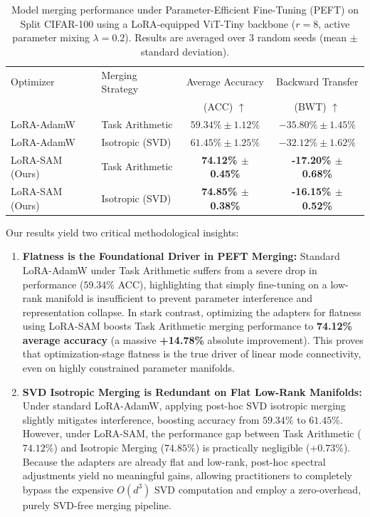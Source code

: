 \begin{table}[t]
  \caption{Model merging performance under Parameter-Efficient Fine-Tuning (PEFT) on Split CIFAR-100 using a LoRA-equipped ViT-Tiny backbone ($r=8$, active parameter mixing $\lambda=0.2$). Results are averaged over 3 random seeds (mean $\pm$ standard deviation).}
  \label{tab:peft_results}
  \vskip 0.1in
  \begin{center}
  \begin{small}
  \begin{sc}
  \setlength{\tabcolsep}{12pt}
  \begin{tabular}{llcc}
    \toprule
    Optimizer & Merging Strategy & Average Accuracy & Backward Transfer \\
    & & (ACC) $\uparrow$ & (BWT) $\uparrow$ \\
    \midrule
    LoRA-AdamW & Task Arithmetic & $59.34\% \pm 1.12\%$ & $-35.80\% \pm 1.45\%$ \\
    LoRA-AdamW & Isotropic (SVD) & $61.45\% \pm 1.25\%$ & $-32.12\% \pm 1.62\%$ \\
    \midrule
    LoRA-SAM (Ours) & Task Arithmetic & \textbf{74.12\% $\pm$ 0.45\%} & \textbf{-17.20\% $\pm$ 0.68\%} \\
    LoRA-SAM (Ours) & Isotropic (SVD) & \textbf{74.85\% $\pm$ 0.38\%} & \textbf{-16.15\% $\pm$ 0.52\%} \\
    \bottomrule
  \end{tabular}
  \end{sc}
  \end{small}
  \end{center}
  \vskip -0.1in
\end{table}

Our results yield two critical methodological insights:
\begin{enumerate}
  \item \textbf{Flatness is the Foundational Driver in PEFT Merging:} Standard LoRA-AdamW under Task Arithmetic suffers from a severe drop in performance ($59.34\%$ ACC), highlighting that simply fine-tuning on a low-rank manifold is insufficient to prevent parameter interference and representation collapse. In stark contrast, optimizing the adapters for flatness using LoRA-SAM boosts Task Arithmetic merging performance to \textbf{74.12\% average accuracy} (a massive \textbf{+14.78\%} absolute improvement). This proves that optimization-stage flatness is the true driver of linear mode connectivity, even on highly constrained parameter manifolds.
  \item \textbf{SVD Isotropic Merging is Redundant on Flat Low-Rank Manifolds:} Under standard LoRA-AdamW, applying post-hoc SVD isotropic merging slightly mitigates interference, boosting accuracy from $59.34\%$ to $61.45\%$. However, under LoRA-SAM, the performance gap between Task Arithmetic ($74.12\%$) and Isotropic Merging ($74.85\%$) is practically negligible ($+0.73\%$). Because the adapters are already flat and low-rank, post-hoc spectral adjustments yield no meaningful gains, allowing practitioners to completely bypass the expensive $O(d^3)$ SVD computation and employ a zero-overhead, purely SVD-free merging pipeline.
\end{enumerate}

